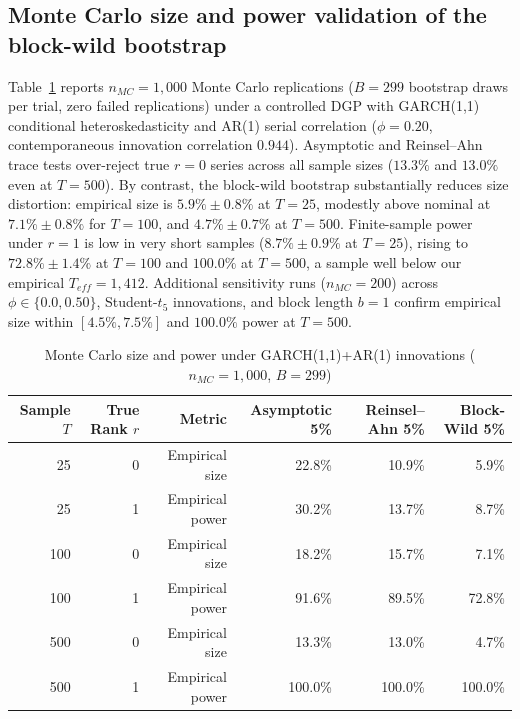 \subsection{Monte Carlo size and power validation of the block-wild bootstrap}
Table~\ref{tab:boot_mc} reports $n_{MC} = 1,000$ Monte Carlo replications ($B = 299$ bootstrap draws per trial, zero failed replications) under a controlled DGP with GARCH(1,1) conditional heteroskedasticity and AR(1) serial correlation ($\phi = 0.20$, contemporaneous innovation correlation $0.944$). Asymptotic and Reinsel--Ahn trace tests over-reject true $r=0$ series across all sample sizes ($13.3\%$ and $13.0\%$ even at $T = 500$). By contrast, the block-wild bootstrap substantially reduces size distortion: empirical size is $5.9\% \pm 0.8\%$ at $T=25$, modestly above nominal at $7.1\% \pm 0.8\%$ for $T=100$, and $4.7\% \pm 0.7\%$ at $T=500$. Finite-sample power under $r=1$ is low in very short samples ($8.7\% \pm 0.9\%$ at $T=25$), rising to $72.8\% \pm 1.4\%$ at $T=100$ and $100.0\%$ at $T=500$, a sample well below our empirical $T_{eff} = 1,412$. Additional sensitivity runs ($n_{MC}=200$) across $\phi \in \{0.0, 0.50\}$, Student-$t_5$ innovations, and block length $b=1$ confirm empirical size within $[4.5\%, 7.5\%]$ and $100.0\%$ power at $T=500$.

\begin{table}[htbp]
\centering
\caption{Monte Carlo size and power under GARCH(1,1)+AR(1) innovations ($n_{MC}=1,000$, $B=299$)}
\label{tab:boot_mc}
\fontsize{6.8}{8}\selectfont\setlength{\tabcolsep}{3pt}
\begingroup
\begin{tabular}{@{}rrrrrr@{}}
\toprule
Sample $T$ & True Rank $r$ & Metric & Asymptotic 5\% & Reinsel--Ahn 5\% & Block-Wild 5\% \\
\midrule
25 & 0 & Empirical size & 22.8\% & 10.9\% & 5.9\% \\
25 & 1 & Empirical power & 30.2\% & 13.7\% & 8.7\% \\
100 & 0 & Empirical size & 18.2\% & 15.7\% & 7.1\% \\
100 & 1 & Empirical power & 91.6\% & 89.5\% & 72.8\% \\
500 & 0 & Empirical size & 13.3\% & 13.0\% & 4.7\% \\
500 & 1 & Empirical power & 100.0\% & 100.0\% & 100.0\% \\
\bottomrule
\end{tabular}\endgroup
\end{table}

